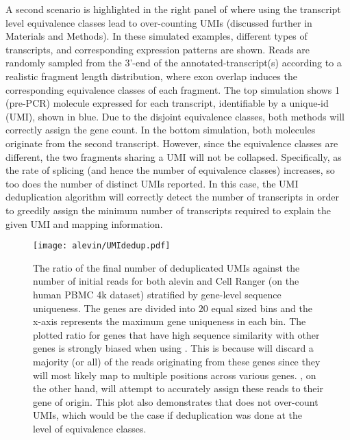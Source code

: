 A second scenario is highlighted in the right panel of 
where using the transcript level equivalence classes lead to over-counting UMIs
(discussed further in Materials and Methods). In these simulated examples, different types of
transcripts, and corresponding expression patterns are shown. 
Reads are randomly sampled from the 3'-end of the
annotated-transcript(s) according to a realistic fragment length distribution,
where exon overlap induces the corresponding equivalence classes of each
fragment. The top simulation shows 1 (pre-PCR) molecule expressed for each transcript, 
identifiable by a unique-id (UMI), shown in blue. Due to the disjoint equivalence classes, both methods will
correctly assign the gene count. In the bottom simulation, both molecules originate from the second transcript. 
However, since the equivalence classes are different, the two fragments sharing a UMI will not be collapsed. 
Specifically, as the rate of splicing (and hence the number of equivalence classes) increases, so too does the number of distinct UMIs 
reported. In this case, the \alevin UMI deduplication algorithm will correctly detect the number of transcripts in order to greedily assign the minimum number of transcripts required to explain the given UMI and mapping information.

\begin{figure*}[!htb]
  \texttt{[image: alevin/UMIdedup.pdf]}
  \caption{The ratio of the final number of deduplicated
    UMIs against the number of initial reads for both alevin and Cell Ranger (on the human PBMC 4k dataset)
    stratified by gene-level sequence uniqueness. The genes are divided into
    $20$ equal sized bins and the x-axis represents the maximum gene uniqueness
    in each bin. The plotted ratio for genes that have high sequence
    similarity with other genes is strongly biased when using \cellr. This is
    because \cellr will discard a majority (or all) of the reads originating
    from these genes since they will most likely map to multiple positions
    across various genes. \Alevin, on the other hand, will attempt to accurately
    assign these reads to their gene of origin. This plot also demonstrates that \alevin does not over-count UMIs,
    which would be the case if deduplication was done at the level of equivalence classes.}
  \label{fig:umidedup}
\end{figure*}

